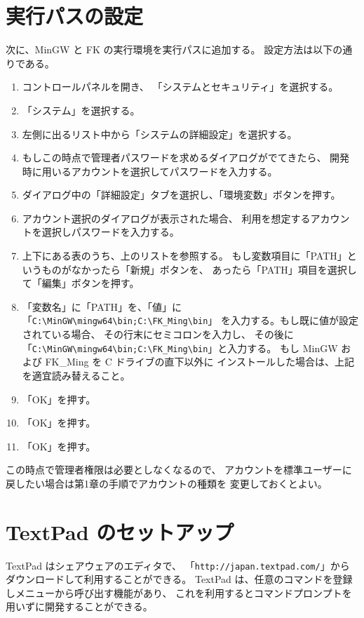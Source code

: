 \documentclass[a4paper]{jsarticle}
\begin{document}
\section{実行パスの設定}
次に、MinGW と FK の実行環境を実行パスに追加する。
設定方法は以下の通りである。
\begin{enumerate}
 \item コントロールパネルを開き、
	「システムとセキュリティ」を選択する。
 \item 「システム」を選択する。
 \item 左側に出るリスト中から「システムの詳細設定」を選択する。
 \item もしこの時点で管理者パスワードを求めるダイアログがでてきたら、
	開発時に用いるアカウントを選択してパスワードを入力する。
 \item ダイアログ中の「詳細設定」タブを選択し、「環境変数」ボタンを押す。
 \item アカウント選択のダイアログが表示された場合、
	利用を想定するアカウントを選択しパスワードを入力する。
 \item 上下にある表のうち、上のリストを参照する。
 	もし変数項目に「PATH」というものがなかったら「新規」ボタンを、
 	あったら「PATH」項目を選択して「編集」ボタンを押す。
 \item 「変数名」に「PATH」を、「値」に
	「\verb+C:\MinGW\mingw64\bin;C:\FK_Ming\bin+」
	を入力する。もし既に値が設定されている場合、
	その行末にセミコロンを入力し、
	その後に「\verb+C:\MinGW\mingw64\bin;C:\FK_Ming\bin+」と入力する。
	もし MinGW および FK\_Ming を C ドライブの直下以外に
	インストールした場合は、上記を適宜読み替えること。
 \item 「OK」を押す。
 \item 「OK」を押す。
 \item 「OK」を押す。
\end{enumerate}
この時点で管理者権限は必要としなくなるので、
アカウントを標準ユーザーに戻したい場合は第1章の手順でアカウントの種類を
変更しておくとよい。

\appendix

\section{TextPad のセットアップ}
TextPad はシェアウェアのエディタで、
「\verb+http://japan.textpad.com/+」からダウンロードして利用することができる。
TextPad は、任意のコマンドを登録しメニューから呼び出す機能があり、
これを利用するとコマンドプロンプトを用いずに開発することができる。
\end{document}
